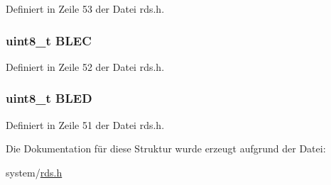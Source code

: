 Definiert in Zeile 53 der Datei rds.\+h.

\hypertarget{structerr_a279b7213c9f5034e0fa7aa8d9c2bc9a2}{}
\subsubsection[{B\+L\+E\+C}]{\setlength{\rightskip}{0pt plus 5cm}uint8\+\_\+t B\+L\+E\+C}\label{structerr_a279b7213c9f5034e0fa7aa8d9c2bc9a2}


Definiert in Zeile 52 der Datei rds.\+h.

\hypertarget{structerr_a3498d51c8fc84119a00242f7bb9b6719}{}
\subsubsection[{B\+L\+E\+D}]{\setlength{\rightskip}{0pt plus 5cm}uint8\+\_\+t B\+L\+E\+D}\label{structerr_a3498d51c8fc84119a00242f7bb9b6719}


Definiert in Zeile 51 der Datei rds.\+h.



Die Dokumentation für diese Struktur wurde erzeugt aufgrund der Datei\+:\begin{DoxyCompactItemize}
\item 
system/\hyperlink{rds_8h}{rds.\+h}\end{DoxyCompactItemize}
